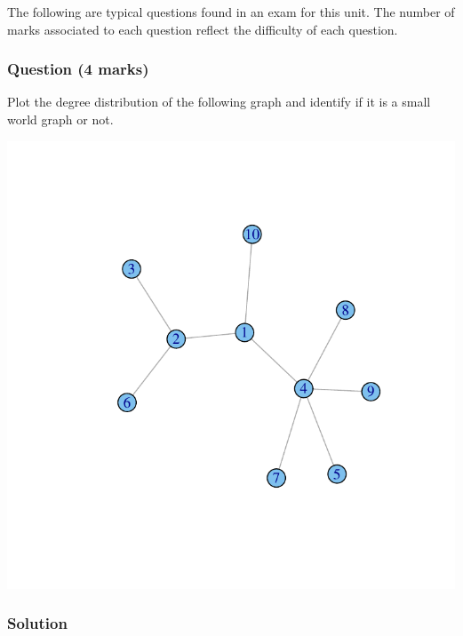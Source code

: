 \documentclass{uws_learning_guide}
\begin{document}
The following are typical questions found in an exam for this
unit. The number of marks associated to each question reflect the
difficulty of each question.


\subsubsection*{Question (4 marks)}

Plot the degree distribution of the following graph and identify if it
is a small world graph or not.

\vspace{-6em}
\begin{center}
\includegraphics{bnetwork}
\end{center}

\vspace{-14em}
\subsubsection*{Solution}
\end{document}
